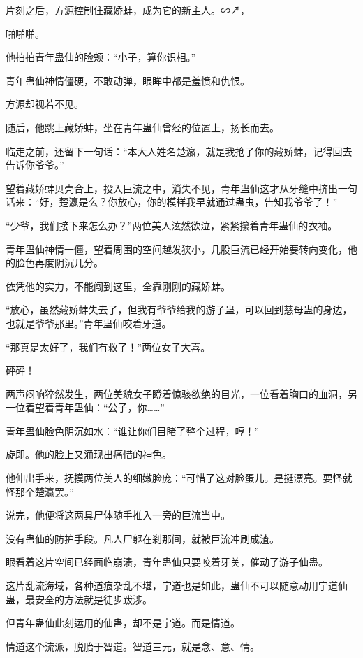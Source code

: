 
\begin{this_body}

片刻之后，方源控制住藏娇蚌，成为它的新主人。∽↗，

啪啪啪。

他拍拍青年蛊仙的脸颊：“小子，算你识相。”

青年蛊仙神情僵硬，不敢动弹，眼眸中都是羞愤和仇恨。

方源却视若不见。

随后，他跳上藏娇蚌，坐在青年蛊仙曾经的位置上，扬长而去。

临走之前，还留下一句话：“本大人姓名楚瀛，就是我抢了你的藏娇蚌，记得回去告诉你爷爷。”

望着藏娇蚌贝壳合上，投入巨流之中，消失不见，青年蛊仙这才从牙缝中挤出一句话来：“好，楚瀛是么？你放心，你的模样我早就通过蛊虫，告知我爷爷了！”

“少爷，我们接下来怎么办？”两位美人泫然欲泣，紧紧攥着青年蛊仙的衣袖。

青年蛊仙神情一僵，望着周围的空间越发狭小，几股巨流已经开始要转向变化，他的脸色再度阴沉几分。

依凭他的实力，不能闯到这里，全靠刚刚的藏娇蚌。

“放心，虽然藏娇蚌失去了，但我有爷爷给我的游子蛊，可以回到慈母蛊的身边，也就是爷爷那里。”青年蛊仙咬着牙道。

“那真是太好了，我们有救了！”两位女子大喜。

砰砰！

两声闷响猝然发生，两位美貌女子瞪着惊骇欲绝的目光，一位看着胸口的血洞，另一位着望着青年蛊仙：“公子，你……”

青年蛊仙脸色阴沉如水：“谁让你们目睹了整个过程，哼！”

旋即。他的脸上又涌现出痛惜的神色。

他伸出手来，抚摸两位美人的细嫩脸庞：“可惜了这对脸蛋儿。是挺漂亮。要怪就怪那个楚瀛罢。”

说完，他便将这两具尸体随手推入一旁的巨流当中。

没有蛊仙的防护手段。凡人尸躯在刹那间，就被巨流冲刷成渣。

眼看着这片空间已经面临崩溃，青年蛊仙只要咬着牙关，催动了游子仙蛊。

这片乱流海域，各种道痕杂乱不堪，宇道也是如此，蛊仙不可以随意动用宇道仙蛊，最安全的方法就是徒步跋涉。

但青年蛊仙此刻运用的仙蛊，却不是宇道。而是情道。

情道这个流派，脱胎于智道。智道三元，就是念、意、情。


\end{this_body}
